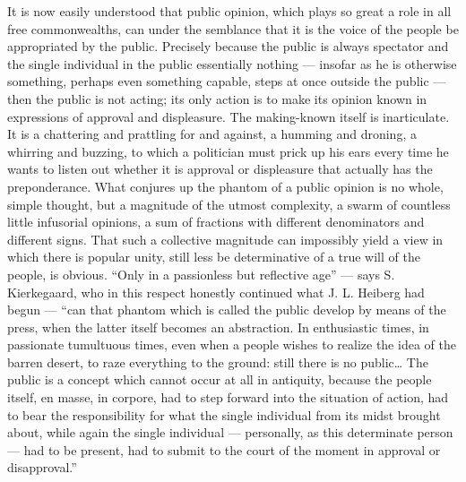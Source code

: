 \documentclass[12pt,a4paper,openany]{book}
\newcommand{\opage}[1]{\marginnote{\footnotesize\textit{[#1]}}}
\begin{document}
It is now easily understood that public opinion, which
plays so great a role in all free commonwealths, can
under the semblance that it is the voice of the people be appropriated
by the public. Precisely because the public is always spectator and
the single individual in the public essentially nothing --- insofar
as he is otherwise something, perhaps even something capable,
\setcounter{footnote}{0}%
\opage{14}steps at once outside the public --- then the public is
not acting; its only action is to make its
opinion known in expressions of approval and displeasure. The making-known
itself is inarticulate. It is a chattering
and prattling for and against, a humming and droning, a whirring
and buzzing, to which a politician must prick up his ears
every time he wants to listen out whether it is approval or displeasure
that actually has the preponderance. What conjures up
the phantom of a public opinion is no whole, simple
thought, but a magnitude of the utmost complexity, a swarm
of countless little infusorial opinions, a sum of fractions
with different denominators and different signs.
That such a collective magnitude can impossibly yield
a view in which there is popular unity, still less
be determinative of a true will of the people, is obvious.
``Only in a passionless but reflective age'' --- says
S. Kierkegaard, who in this respect honestly continued
what J. L. Heiberg had begun --- ``can that phantom
which is called the public develop by means of the press,
when the latter itself becomes an abstraction. In enthusiastic
times, in passionate tumultuous times, even when a
people wishes to realize the idea of the barren desert, to raze
everything to the ground: still there is no public\dots{} The public is a
concept which cannot occur at all in antiquity, because
the people itself, en masse, in corpore, had to step forward into
the situation of action, had to bear the responsibility for what
the single individual from its midst brought about, while again the
single individual --- personally, as this determinate person --- had to be
present, had to submit to the court of the moment in
approval or disapproval.''
\end{document}
